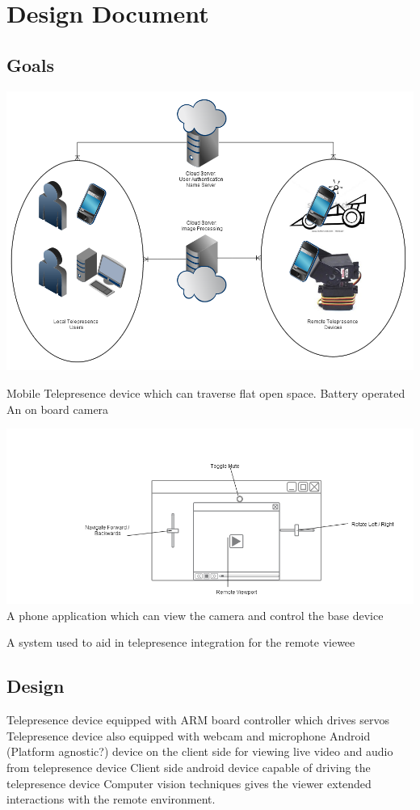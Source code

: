 \documentclass[final,a4paper,12pt]{report}
\begin{document}
\chapter{Design Document}

\section{Goals}
\includegraphics{networkProfile_Labeled}

Mobile Telepresence device which can traverse flat open space.
Battery operated
An on board camera

\includegraphics{MobileGUI_Labeled}
A phone application which can view the camera and control the base device

A system used to aid in telepresence integration for the remote viewee

\section{Design}
Telepresence device equipped with ARM board controller which drives servos
Telepresence device also equipped with webcam and microphone
Android (Platform agnostic?) device on the client side for viewing live video and audio from telepresence device
Client side android device capable of driving the telepresence device
Computer vision techniques gives the viewer extended interactions with the remote environment. 
\end{document}

